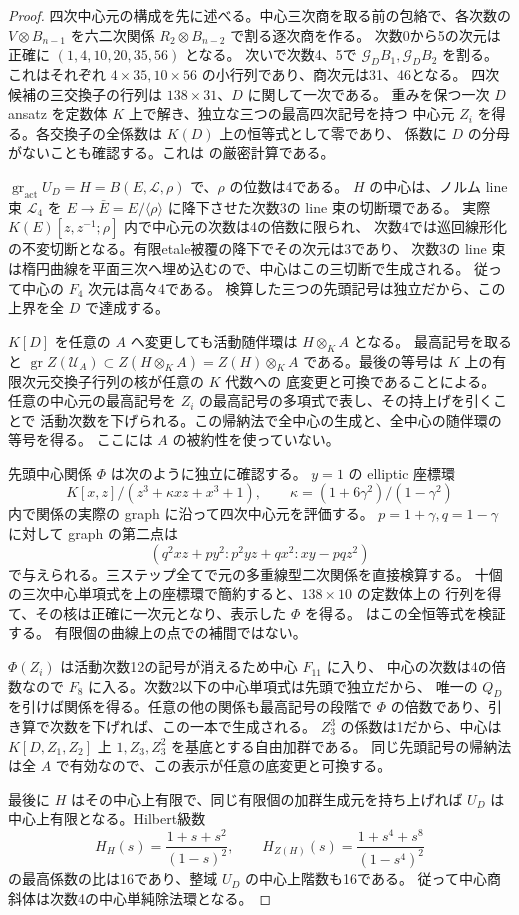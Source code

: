 \begin{proof}
四次中心元の構成を先に述べる。中心三次商を取る前の包絡で、各次数の
$V\otimes B_{n-1}$ を六二次関係 $R_2\otimes B_{n-2}$ で割る逐次商を作る。
次数0から5の次元は正確に $(1,4,10,20,35,56)$ となる。
次いで次数4、5で $\mathcal G_D B_1,\mathcal G_D B_2$ を割る。
これはそれぞれ $4\times35,10\times56$ の小行列であり、商次元は31、46となる。
四次候補の三交換子の行列は $138\times31$、$D$ に関して一次である。
重みを保つ一次 $D$ ansatz を定数体 $K$ 上で解き、独立な三つの最高四次記号を持つ
中心元 $Z_i$ を得る。各交換子の全係数は $K(D)$ 上の恒等式として零であり、
係数に $D$ の分母がないことも確認する。これは
 の厳密計算である。

$\operatorname{gr}_{\mathrm{act}}U_D=H=B(E,\mathcal L,\rho)$ で、$\rho$ の位数は4である。
$H$ の中心は、ノルム line 束 $\mathcal L_4$ を
$E\to\bar E=E/\langle\rho\rangle$ に降下させた次数3の line 束の切断環である。
実際 $K(E)[z,z^{-1};\rho]$ 内で中心元の次数は4の倍数に限られ、
次数4では巡回線形化の不変切断となる。有限etale被覆の降下でその次元は3であり、
次数3の line 束は楕円曲線を平面三次へ埋め込むので、中心はこの三切断で生成される。
従って中心の $F_4$ 次元は高々4である。
検算した三つの先頭記号は独立だから、この上界を全 $D$ で達成する。

$K[D]$ を任意の $A$ へ変更しても活動随伴環は $H\otimes_K A$ となる。
最高記号を取ると
$\operatorname{gr}Z(\mathcal U_A)\subset Z(H\otimes_K A)=Z(H)\otimes_K A$
である。最後の等号は $K$ 上の有限次元交換子行列の核が任意の $K$ 代数への
底変更と可換であることによる。
任意の中心元の最高記号を $Z_i$ の最高記号の多項式で表し、その持上げを引くことで
活動次数を下げられる。この帰納法で全中心の生成と、全中心の随伴環の等号を得る。
ここには $A$ の被約性を使っていない。

先頭中心関係 $\Phi$ は次のように独立に確認する。
$y=1$ の elliptic 座標環
\[
 K[x,z]/(z^3+\kappa xz+x^3+1),\qquad
 \kappa=(1+6\gamma^2)/(1-\gamma^2)
\]
内で関係の実際の graph に沿って四次中心元を評価する。
$p=1+\gamma,q=1-\gamma$ に対して graph の第二点は
\[
 (q^2xz+py^2:p^2yz+qx^2:xy-pqz^2)
\]
で与えられる。三ステップ全てで元の多重線型二次関係を直接検算する。
十個の三次中心単項式を上の座標環で簡約すると、$138\times10$ の定数体上の
行列を得て、その核は正確に一次元となり、表示した $\Phi$ を得る。
 はこの全恒等式を検証する。
有限個の曲線上の点での補間ではない。

$\Phi(Z_i)$ は活動次数12の記号が消えるため中心 $F_{11}$ に入り、
中心の次数は4の倍数なので $F_8$ に入る。次数2以下の中心単項式は先頭で独立だから、
唯一の $Q_D$ を引けば関係を得る。任意の他の関係も最高記号の段階で
$\Phi$ の倍数であり、引き算で次数を下げれば、この一本で生成される。
$Z_3^3$ の係数は1だから、中心は $K[D,Z_1,Z_2]$ 上
$1,Z_3,Z_3^2$ を基底とする自由加群である。
同じ先頭記号の帰納法は全 $A$ で有効なので、この表示が任意の底変更と可換する。

最後に $H$ はその中心上有限で、同じ有限個の加群生成元を持ち上げれば
$U_D$ は中心上有限となる。Hilbert級数
\[
 H_H(s)=\frac{1+s+s^2}{(1-s)^2},\qquad
 H_{Z(H)}(s)=\frac{1+s^4+s^8}{(1-s^4)^2}
\]
の最高係数の比は16であり、整域 $U_D$ の中心上階数も16である。
従って中心商斜体は次数4の中心単純除法環となる。
\end{proof}

